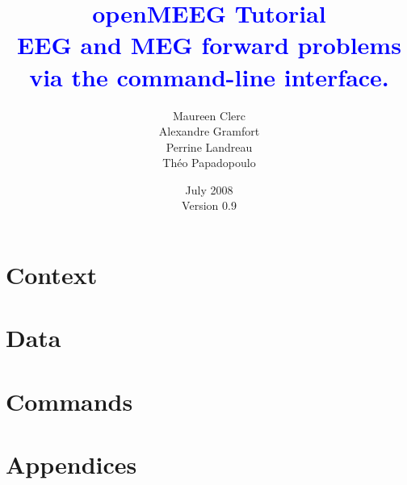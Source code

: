 \documentclass[10pt,a4paper,makeidx]{book}
\title{{\textbf{\textcolor{blue}{openMEEG Tutorial\\
        {\Large EEG and MEG forward problems\\
                via the command-line interface.}}}}}
\author{Maureen Clerc\\Alexandre Gramfort \\
        Perrine Landreau\\Théo Papadopoulo}
\date{July 2008\\
      Version 0.9}
\begin{document}
    \maketitle
    \tableofcontents

    \chapter{Context}
    

    \chapter{Data}
    

    \chapter{Commands}
    

    \appendix
    \chapter{Appendices}
    
\end{document}
